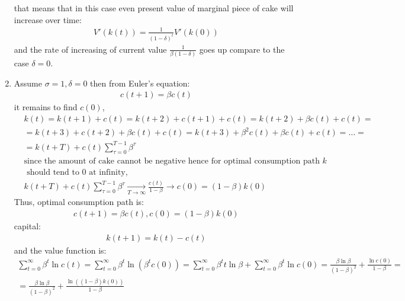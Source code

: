 \documentclass[a4paper]{article}
\begin{document}
\begin{enumerate}
that means that in this case even present value of marginal piece of cake will increase over time:
\begin{align*}
V'(k(t)) = \frac{1}{(1 - \delta)^t}V'(k(0))
\end{align*}
and the rate of increasing of current value $\frac{1}{\beta(1-\delta)}$ goes up compare to the case $\delta = 0$.
\item Assume $\sigma = 1, \delta = 0$ then
from Euler's equation:
\begin{align*}
c(t+1) = \beta c(t)
\end{align*}
it remains to find $c(0)$,
\begin{align*}
&k(t) = k(t+1) + c(t) = k(t+2) + c(t+1) + c(t) = k(t+2) + \beta c(t) + c(t) = \\
&=k(t+3) + c(t+2) + \beta c(t) + c(t) = k(t+3) + \beta^2 c(t) + \beta c(t) + c(t) = \dots =\\
&=k(t + T) + c(t) \sum_{\tau = 0}^{T-1} \beta^{\tau} \\
&\text{since the amount of cake cannot be negative hence for optimal consumption path } k\\
&\text{ should tend to 0 at infinity, }\\
&k(t + T) + c(t) \sum_{\tau = 0}^{T-1} \beta^{\tau} \underset{T \to \infty}{\to} \frac{c(t)}{1-\beta} \to c(0) = (1-\beta)k(0)
\end{align*}
Thus, optimal consumption path is:
\begin{align*}
c(t+1) = \beta c(t), c(0) = (1-\beta)k(0)
\end{align*}
capital:
\begin{align*}
k(t+1) = k(t) - c(t)
\end{align*}
and the value function is:
\begin{align*}
\sum_{t=0}^{\infty} \beta^t \ln c(t) = \sum_{t=0}^{\infty} \beta^{t} \ln (\beta^t c(0)) = \sum_{t=0}^{\infty} \beta^t t \ln \beta + \sum_{t=0}^{\infty} \beta^t \ln c(0) = \frac{\beta \ln \beta}{(1-\beta)^2} + \frac{\ln c(0)}{1 - \beta } = \\
=\frac{\beta \ln \beta}{(1-\beta)^2} + \frac{\ln((1-\beta)k(0))}{1-\beta}
\end{align*}
\end{enumerate}
\end{document}
